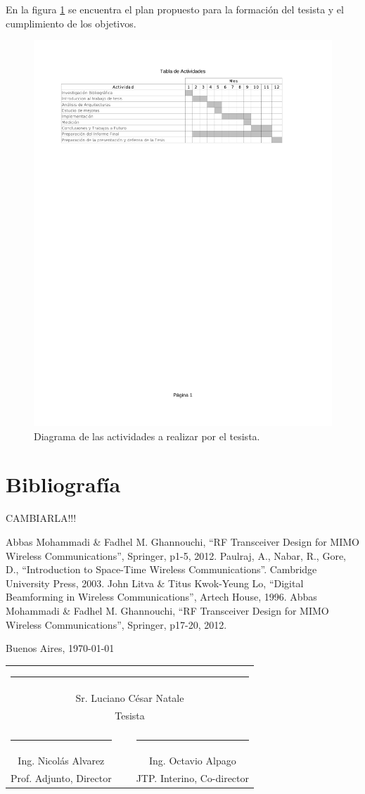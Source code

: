 \documentclass[a4paper]{article}
\newcommand{\signature}[7]{
	\vfill

	\begin{flushright}
		#1, \today
	\end{flushright}
	\vspace{3cm}

	\noindent
	\centering
	\begin{tabularx}{0.9\textwidth}{cXc}
		\multicolumn{3}{c}{\rule{5cm}{1pt}}\\
		\multicolumn{3}{c}{#2}\\
		\multicolumn{3}{c}{#3}\\
		\vspace{3cm}\\
		\rule{5cm}{1pt} & \hspace{2.5cm} & \rule{5cm}{1pt} \\
		#4 & ~ & #5 \\
		#6 & ~ & #7
	\end{tabularx}
	\vspace{1cm}
}
\begin{document}
En la figura \ref{TablaActividades} se encuentra el plan propuesto para la formación del tesista y el cumplimiento de los objetivos.

\begin{figure}[h!]
	\label{TablaActividades}
	\includegraphics[trim = 20mm 200mm 20mm 25mm, clip, width=\textwidth]{tabla_actividades}
	\caption{Diagrama de las actividades a realizar por el tesista.}
\end{figure}

\newpage

\section{Bibliografía}

CAMBIARLA!!!

\begin{thebibliography}{99}

 Abbas Mohammadi \& Fadhel M. Ghannouchi, ``RF Transceiver Design for MIMO Wireless Communications'', Springer, p1-5, 2012.
 Paulraj, A., Nabar, R., Gore, D., ``Introduction to Space-Time Wireless Communications''. Cambridge University Press, 2003.
 John Litva \& Titus Kwok-Yeung Lo, ``Digital Beamforming in Wireless Communications'', Artech House, 1996.
 Abbas Mohammadi \& Fadhel M. Ghannouchi, ``RF Transceiver Design for MIMO Wireless Communications'', Springer, p17-20, 2012.
\end{thebibliography}

\newpage

\signature{Buenos Aires}{Sr. Luciano César Natale}{Tesista}{Ing. Nicolás Alvarez}{Ing. Octavio Alpago}{Prof. Adjunto, Director}{JTP. Interino, Co-director}
\end{document}
